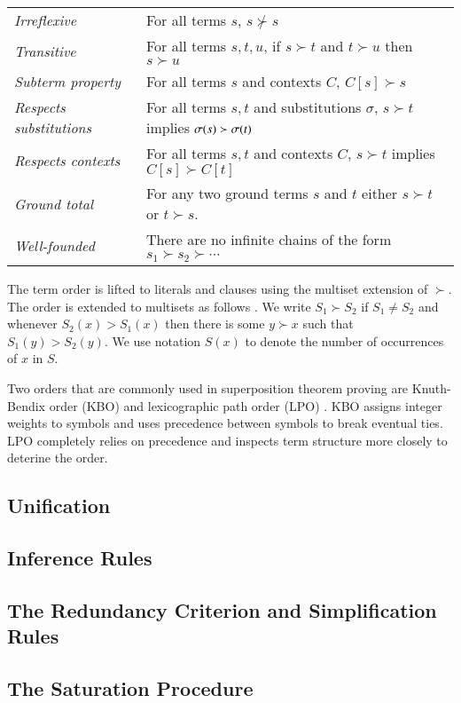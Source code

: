 \noindent\begin{tabular}{p{}p{}}
    \textit{Irreflexive} & For all terms $s$, $s \not\succ s$ \\
    \textit{Transitive} & For all terms $s, t, u$,  if $s\succ t$ and $t \succ u$ then $s \succ u$ \\ 
    \textit{Subterm property} & For all terms $s$ and contexts $C$, $C[s] \succ s$ \\
    \textit{Respects substitutions} & For all terms $s, t$ and substitutions $\sigma$, $s \succ t$ implies $\sigma(s) \succ \sigma(t)$ \\
    \textit{Respects contexts} & For all terms $s,t$ and contexts $C$, $s \succ t$ implies $C[s] \succ C[t]$ \\
    \textit{Ground total} & For any two
    ground terms $s$ and $t$ either $s \succ t$ or $t \succ s$. \\
    \textit{Well-founded} & There are no infinite chains of the form $s_1 \succ s_2 \succ \cdots$ 
\end{tabular}

The term order is lifted to literals and clauses using the multiset extension of
$\succ$. The order is extended to multisets as follows
\cite[Sect.~2.5]{bg-01-resolution}. We write $S_1 \succ S_2$ if $S_1 \not= S_2$
and whenever $S_2(x) > S_1(x)$ then there is some $y \succ x$ such that $S_1(y)
> S_2(y)$. We use notation $S(x)$ to denote the number of occurrences of $x$ in
$S$. 

Two orders that are commonly used in superposition theorem proving are
Knuth-Bendix order (KBO) \cite[Sect.~5.4.4]{bn-98-tr-and-all-that} and
lexicographic path order (LPO) \cite[Sect.~5.4.2]{bn-98-tr-and-all-that}.
KBO assigns integer weights to symbols and uses precedence between symbols to
break eventual ties. LPO completely relies on precedence and inspects term
structure more closely to deterine the order. 


\subsection{Unification}
\subsection{Inference Rules}
\subsection{The Redundancy Criterion and Simplification Rules}
\subsection{The Saturation Procedure}

